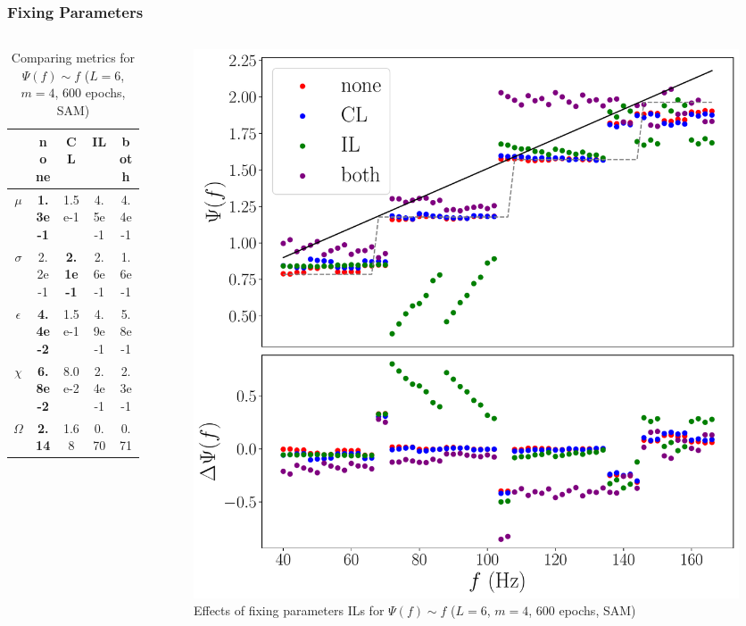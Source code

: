 \documentclass{beamer}
\begin{document}
\begin{frame}
\frametitle{Fixing Parameters}
\begin{columns}
\begin{column}{0.52\textwidth}
\begin{table}
\begin{tabular}{c || c| c | c| c }
&none & CL & IL & both \\ \hline \hline 
$\mu$ & \textbf{1.3e-1} & 1.5e-1 & 4.5e-1 & 4.4e-1   \\
$\sigma$ & 2.2e-1 & \textbf{2.1e-1} & 2.6e-1 & 1.6e-1  \\
$\epsilon$  & \textbf{4.4e-2} & 1.5e-1 & 4.9e-1 & 5.8e-1 \\
$\chi$ & \textbf{6.8e-2} & 8.0e-2 & 2.4e-1 & 2.3e-1 \\ \hline 
$\Omega$ & \textbf{2.14} & 1.68 & 0.70 & 0.71 
\end{tabular}
\caption{Comparing metrics for $\Psi(f) \sim f$ ($L=6$, $m=4$, 600 epochs, SAM)}
\end{table}
\end{column}
\begin{column}{0.48\textwidth}
\begin{figure}
\centering 
\includegraphics[width=\textwidth]{im/phase_RP_comp_linear_m4}
\caption{Effects of fixing parameters ILs for $\Psi(f) \sim f$ ($L=6$, $m=4$, 600 epochs, SAM)}
\end{figure}
\end{column}
\end{columns}
\end{frame}
\end{document}
